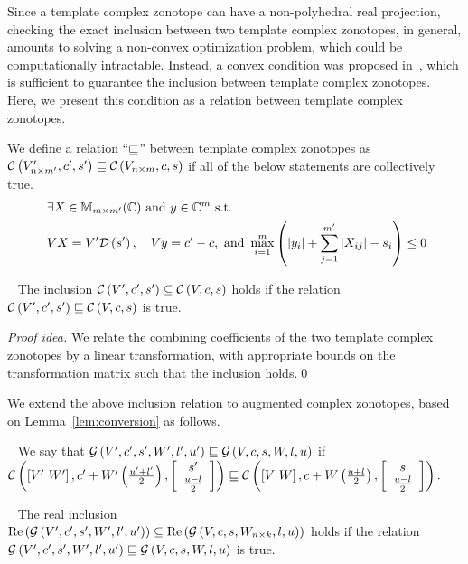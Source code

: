 Since a template complex zonotope can have a non-polyhedral real
projection, checking the exact inclusion between two template complex
zonotopes, in general, amounts to solving a non-convex optimization
problem, which could be computationally intractable.  Instead, a
convex condition was proposed in~\cite{tcz2017}, which is sufficient
to guarantee the inclusion between template complex zonotopes.  Here,
we present this condition as a relation between template complex
zonotopes.
%
\begin{definition}
We define a relation ``$\order$'' between template complex zonotopes
as\\ $\cz{V^\pr_{n\times m^\pr}}{c^\pr}{s^\pr}\order \cz{V_{n\times
    m}}{c}{s}$ if all of the below statements are collectively true.
\begin{align}~\label{eqn:tcz-inc}
\begin{split}
& \exists X\in\mat{m}{m^\pr}{\mb{C}}~\text{and}~y\in\mb{C}^{m}~\text{s.t.}\\
& \transfer{V}{V^\pr}{s^\pr}{X},~~~\centertransfer{V}{c}{c^\pr}{y},~\text{and}~
 \scalebound{X}{y}{s}{m}{m^\pr}\leq 0\\
\end{split}
\end{align}
\end{definition}
%
\begin{lemma}~\label{lem:zon-zon} The
inclusion $\cz{V^\pr}{c^\pr}{s^\pr}\subseteq \cz{V}{c}{s}$ holds if
the relation $\cz{{V^\pr}}{c^\pr}{s^\pr}\order \cz{V}{c}{s}$ is true.
\end{lemma}
\emph{Proof idea.}
We relate the combining
coefficients of the two template complex zonotopes by a linear
transformation, with appropriate bounds on the transformation matrix
such that the inclusion holds.\qed

We extend the above inclusion relation to augmented complex zonotopes,
based on Lemma~\ref{lem:conversion} as follows.
%
\begin{definition}~\label{defn:gcz-order}
We say that $\gcz{V^\pr}{c^\pr}{s^\pr}{W^\pr}{l^\pr}{u^\pr}\order
\gcz{V}{c}{s}{W}{l}{u}$ if\\ $\cz{\lt[V^\pr~W^\pr\rt]}{c^\pr+W^\pr\lt(\frac{u^\pr+l^\pr}{2}\rt)}{\ColumnJoin{s^\pr}{\frac{u-l}{2}}}
\order
\cz{\lt[V~W\rt]}{c+W\lt(\frac{u+l}{2}\rt)}{\ColumnJoin{s}{\frac{u-l}{2}}}.$
\end{definition}
%
\begin{lemma}~\label{lem:gcz-gcz} The real inclusion\\
$\real\lt(\gcz{V^\pr}{c^\pr}{s^\pr}{W^\pr}{l^\pr}{u^\pr}\rt)\subseteq \real\lt(\gcz{V}{c}{s}{W_{n\times
k}}{l}{u}\rt)$ holds if the relation\\
$\gcz{V^\pr}{c^\pr}{s^\pr}{W^\pr}{l^\pr}{u^\pr}\order \gcz{V}{c}{s}{W}{l}{u}$ is true.
\end{lemma}


